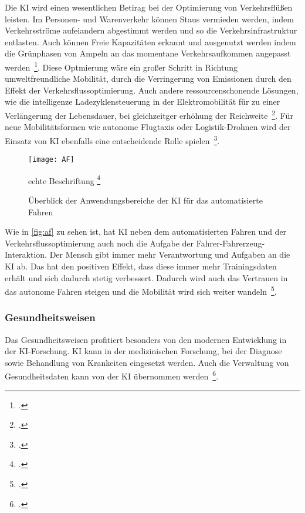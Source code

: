 Die \ac{KI} wird einen wesentlichen Betirag bei der Optimierung von Verkehrsflüßen leisten. Im Personen- und Warenverkehr können Staus vermieden werden, indem Verkehrsströme aufeiandern 
abgestimmt werden und so die Verkehrsinfrastruktur entlasten. Auch können Freie Kapazitäten erkannt und ausgenutzt werden indem die Grünphasen von Ampeln an das momentane
Verkehrsaufkommen angepasst werden~\footcite[\vglf][]{Wittpahl.2018}. Diese Optmierung wäre ein großer Schritt in Richtung umweltfreundliche Mobilität, durch die 
Verringerung von Emissionen durch den Effekt der Verkehrsflussoptimierung. Auch andere ressourcenschonende Lösungen, wie die intelligenze Ladezyklensteuerung in der Elektromobilität
für zu einer Verlängerung der Lebensdauer, bei gleichzeitger erhöhung der Reichweite~\footcite[\vglf][]{Wittpahl.2018}.
Für neue Mobilitätsformen wie autonome Flugtaxis oder Logistik-Drohnen wird der Einsatz von KI ebenfalls eine entscheidende Rolle spielen~\footcite[][]{Wittpahl.2018}.

%
\begin{figure}[H]
    \texttt{[image: AF]} 
    \caption{Überblick der Anwendungsbereiche der KI für das automatisierte Fahren}{echte Beschriftung\footnotemark}
    \footcite[Quelle: ][]{Wittpahl.2018}
    \label{fig:af}
\end{figure}

Wie in \autoref{fig:af} zu sehen ist, hat \ac{KI} neben dem automatisierten Fahren und der Verkehrsflussoptimierung auch noch die Aufgabe der Fahrer-Fahrerzeug-Interaktion. Der Mensch 
gibt immer mehr Verantwortung und Aufgaben an die \ac{KI} ab. Das hat den positiven Effekt, dass diese immer mehr Trainingsdaten erhält und sich dadurch stetig verbessert.
Dadurch wird auch das Vertrauen in das autonome Fahren steigen und die Mobilität wird sich weiter wandeln~\footcite[\vglf][]{Wittpahl.2018}.

\subsubsection{Gesundheitsweisen}

Das Gesundheitsweisen profitiert besonders von den modernen Entwicklung in der \ac{KI}-Forschung. \ac{KI} kann in der medizinischen Forschung, bei der Diagnose sowie Behandlung 
von Krankeiten eingesetzt werden. Auch die Verwaltung von Gesundheitsdaten kann von der \ac{KI} übernommen werden~\footcite[\vglf][]{Robot.2023}.

